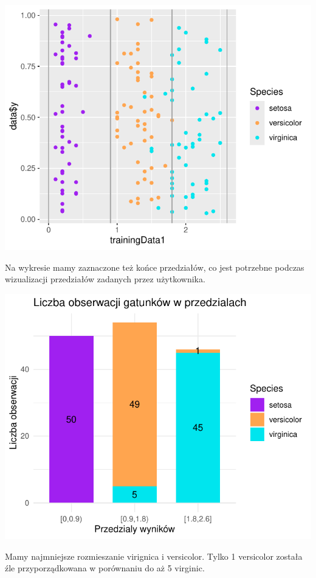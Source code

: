 \documentclass[
  12pt,
]{article}
\begin{document}
\begin{center}\includegraphics{Sprawozdanie2_files/figure-latex/givenRanges_najl-1} \end{center}

Na wykresie mamy zaznaczone też końce przedziałów, co jest potrzebne
podczas wizualizacji przedziałów zadanych przez użytkownika.

\begin{center}\includegraphics{Sprawozdanie2_files/figure-latex/tabela_kondygnacji_4_najl-1} \end{center}

Mamy najmniejsze rozmieszanie virignica i versicolor. Tylko 1 versicolor
została źle przyporządkowana w porównaniu do aż 5 virginic.
\end{document}
